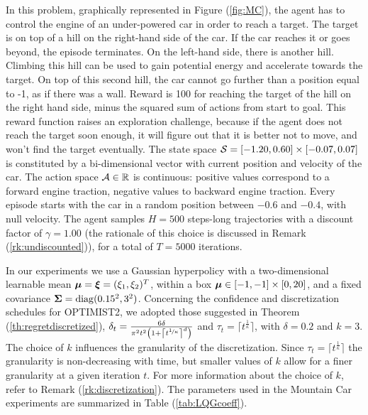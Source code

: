 In this problem, graphically represented in Figure (\ref{fig:MC}), the agent has to control the engine of an under-powered car in order to reach a target. The target is on top of a hill on the right-hand side of the car. If the car reaches it or goes beyond, the episode terminates. On the left-hand side, there is another hill. Climbing this hill can be used to gain potential energy and accelerate towards the target. On top of this second hill, the car cannot go further than a position equal to -1, as if there was a wall. Reward is 100 for reaching the target of the hill on the right hand side, minus the squared sum of actions from start to goal. This reward function raises an exploration challenge, because if the agent does not reach the target soon enough, it will figure out that it is better not to move, and won't find the target eventually. The state space $\mathcal{S}=[-1.20,0.60]\times[-0.07,0.07]$ is constituted by a bi-dimensional vector with current position and velocity of the car. The action space $\mathcal{A}\in\mathbb{R}$ is continuous: positive values correspond to a forward engine traction, negative values to backward engine traction. Every episode starts with the car in a random position between $-0.6$ and $-0.4$, with null velocity. The agent samples $H=500$ steps-long trajectories with a discount factor of $\gamma=1.00$ (the rationale of this choice is discussed in Remark (\ref{rk:undiscounted})), for a total of $T=5000$ iterations. 

In our experiments we use a Gaussian hyperpolicy with a two-dimensional learnable mean $\boldsymbol{\mu}=\boldsymbol{\xi}=(\xi_1, \xi_2)^T$, within a box $\boldsymbol{\mu}\in[-1,-1]\times[0,20]$, and a fixed covariance $\boldsymbol{\Sigma}=\mathrm{diag}(0.15^2,3^2)$. Concerning the confidence and discretization schedules for \gls{OPTIMIST}2, we adopted those suggested in Theorem (\ref{th:regretdiscretized}), \ie ${\delta_t = \frac{6\delta}{\pi^2t^2\left(1+\left\lceil t^{\nicefrac{1}{\kappa}}\right\rceil^d\right)}}$ and $\tau_t=\lceil t^{\frac{1}{\kappa}} \rceil$, with $\delta=0.2$ and $k=3$. The choice of $k$ influences the granularity of the discretization. Since $\tau_t=\lceil t^{\frac{1}{\kappa}} \rceil$ the granularity is non-decreasing with time, but smaller values of $k$ allow for a finer granularity at a given iteration $t$. For more information about the choice of $k$, refer to Remark (\ref{rk:discretization}). The parameters used in the Mountain Car experiments are summarized in Table (\ref{tab:LQGcoeff}).

